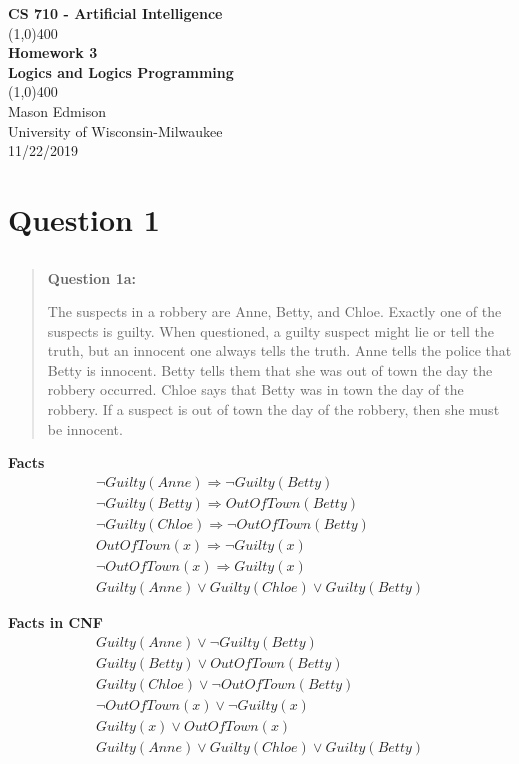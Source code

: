 \documentclass[11pt]{article}
\begin{document}
\begin{titlepage}
\begin{center}
\Large{\textbf{CS 710 - Artificial Intelligence}} \\
\vfill
\line(1,0){400} \\
\huge{\textbf{Homework 3}} \\
\Large{\textbf{Logics and Logics Programming}} \\
\line(1,0){400}\\
\vfill
Mason Edmison\\
University of Wisconsin-Milwaukee\\
11/22/2019
\end{center}
\end{titlepage}

\section{Question 1}
\subsection{}
\begin{quote}
    \textbf{Question 1a:} 

The suspects in a robbery are Anne, Betty, and Chloe.
Exactly one of the suspects is guilty.
When questioned, a guilty suspect might lie or tell the truth, but an innocent one always tells the truth.
Anne tells the police that Betty is innocent.
Betty tells them that she was out of town the day the robbery occurred.
Chloe says that Betty was in town the day of the robbery.
If a suspect is out of town the day of the robbery, then she must be innocent.
\end{quote}

\large \textbf{Facts}
\begin{align}
\lnot Guilty(Anne) \Rightarrow \lnot Guilty(Betty) \\ 
\lnot Guilty(Betty) \Rightarrow OutOfTown(Betty) \\  
\lnot Guilty(Chloe) \Rightarrow \lnot OutOfTown(Betty) \\  
OutOfTown(x) \Rightarrow \lnot Guilty(x) \\
\lnot OutOfTown(x) \Rightarrow Guilty (x) \\ 
Guilty(Anne) \lor Guilty(Chloe) \lor Guilty (Betty) 
\end{align}

\large \textbf{Facts in CNF}
\begin{align}
Guilty(Anne) \lor \lnot Guilty(Betty) \\
Guilty(Betty)  \lor OutOfTown(Betty) \\
Guilty(Chloe) \lor \lnot OutOfTown(Betty) \\
\lnot  OutOfTown(x) \lor \lnot Guilty(x) \\
Guilty(x) \lor OutOfTown(x) \\
Guilty(Anne) \lor Guilty(Chloe) \lor Guilty(Betty) 
\end{align}
\end{document}
